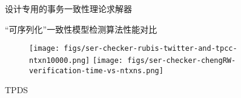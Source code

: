 \begin{frame}{}
  \begin{center}
		设计专用的事务一致性理论求解器

  \end{center}
\end{frame}

\begin{frame}{}
	\begin{center}
		``可序列化''一致性模型检测算法性能对比
	\end{center}

	\begin{figure}[H]
		\centering
		\texttt{[image: figs/ser-checker-rubis-twitter-and-tpcc-ntxn10000.png]}
		\texttt{[image: figs/ser-checker-chengRW-verification-time-vs-ntxns.png]}
	\end{figure}
\end{frame}

\begin{frame}{}
  TPDS
\end{frame}

\begin{frame}{}
	\begin{center}
	\end{center}
\end{frame}
